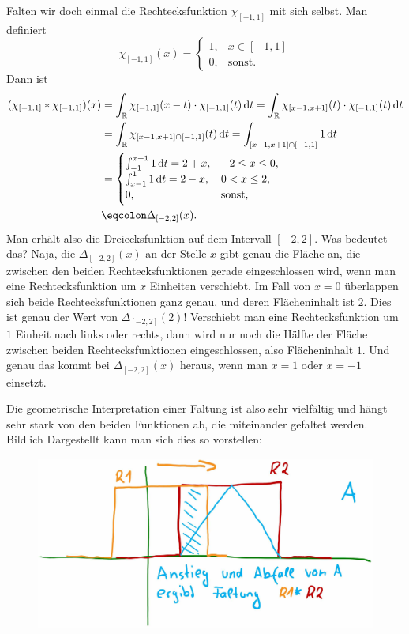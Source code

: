 \begin{example}[Faltung]
Falten wir doch einmal die Rechtecksfunktion $ \chi_{[-1,1]} $ mit sich selbst. Man definiert
\[
  \chi_{[-1,1]}(x) = \begin{cases} 1, & x \in [-1,1] \\ 0, & \text{sonst}. \end{cases}
\]
Dann ist
\begin{align*}
   (\chi_{[-1,1]} * \chi_{[-1,1]})(x) 
&= \int_{\R} \chi_{[-1,1]}(x - t) \cdot \chi_{[-1,1]}(t) \dif t
 = \int_{\R} \chi_{[x - 1, x + 1]}(t) \cdot \chi_{[-1,1]}(t) \dif t \\
&= \int_{\R} \chi_{[x - 1, x + 1] \cap [-1,1]}(t) \dif t
 = \int_{[x - 1, x + 1] \cap [-1,1]} 1 \dif t \\
&= \begin{cases}
      \int_{-1}^{x+1} 1 \dif t = 2 + x, & -2 \leq x \leq 0, \\
      \int_{x-1}^{1} 1 \dif t = 2 - x, & 0 < x \leq 2, \\
      0, & \text{sonst},
   \end{cases} \\
&\eqcolon \Delta_{[-2,2]}(x).
\end{align*}
Man erhält also die Dreiecksfunktion auf dem Intervall $ [-2,2] $. Was bedeutet das? Naja, die
$ \Delta_{[-2,2]}(x) $ an der Stelle $ x $ gibt genau die Fläche an, die zwischen den beiden 
Rechtecksfunktionen gerade eingeschlossen wird, wenn man eine Rechtecksfunktion um $ x $ Einheiten
verschiebt. Im Fall von $ x = 0 $ überlappen sich beide Rechtecksfunktionen ganz genau, und deren
Flächeninhalt ist $ 2 $. Dies ist genau der Wert von $ \Delta_{[-2,2]}(2) $! Verschiebt man eine
Rechtecksfunktion um $ 1 $ Einheit nach links oder rechts, dann wird nur noch die Hälfte der
Fläche zwischen beiden Rechtecksfunktionen eingeschlossen, also Flächeninhalt $ 1 $. Und genau das
kommt bei $ \Delta_{[-2,2]}(x) $ heraus, wenn man $ x = 1 $ oder $ x = -1 $ einsetzt.

Die geometrische Interpretation einer Faltung ist also sehr vielfältig und hängt sehr stark von den
beiden Funktionen ab, die miteinander gefaltet werden.\\
Bildlich Dargestellt kann man sich dies so vorstellen:
\begin{figure}[h]
	\centering
	\includegraphics[width=0.5\linewidth]{Bilder/Faltung}
	\caption{}
	\label{fig:L1}
\end{figure}
\end{example}


